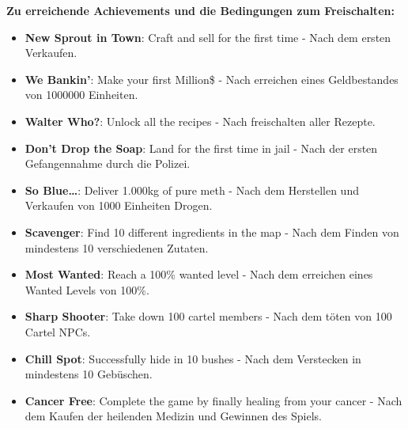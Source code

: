 \textbf{Zu erreichende Achievements und die Bedingungen zum Freischalten:}
\begin{itemize}
    \item \textbf{New Sprout in Town}: Craft and sell for the first time \newline - Nach dem ersten Verkaufen.
    \item \textbf{We Bankin’}: Make your first Million\$ \newline - Nach erreichen eines Geldbestandes von 1000000 Einheiten.
    \item \textbf{Walter Who?}: Unlock all the recipes \newline - Nach freischalten aller Rezepte.
    \item \textbf{Don’t Drop the Soap}: Land for the first time in jail \newline - Nach der ersten Gefangennahme durch die Polizei.
    \item \textbf{So Blue…}: Deliver 1.000kg of pure meth \newline - Nach dem Herstellen und Verkaufen von 1000 Einheiten Drogen.
    \item \textbf{Scavenger}: Find 10 different ingredients in the map \newline - Nach dem Finden von mindestens 10 verschiedenen Zutaten.
    \item \textbf{Most Wanted}: Reach a 100\% wanted level \newline - Nach dem erreichen eines Wanted Levels von 100\%.
    \item \textbf{Sharp Shooter}: Take down 100 cartel members \newline - Nach dem töten von 100 Cartel NPCs.
    \item \textbf{Chill Spot}: Successfully hide in 10 bushes \newline - Nach dem Verstecken in mindestens 10 Gebüschen.
    \item \textbf{Cancer Free}: Complete the game by finally healing from your cancer \newline - Nach dem Kaufen der heilenden Medizin und Gewinnen des Spiels.
\end{itemize}